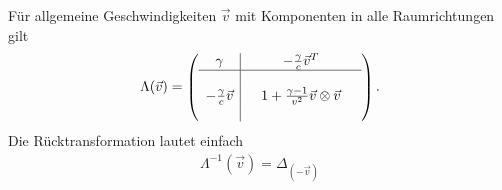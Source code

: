 Für allgemeine Geschwindigkeiten $\vec v$ mit Komponenten in alle Raumrichtungen gilt
\begin{align*}
    \Lambda(\vec v)=
    \left(\begin{array}{c|ccc}
              \gamma                   &  & -\frac{\gamma}{c}\vec{v}^T                    & \\
              \hline
                                       &  &                                               & \\
              -\frac{\gamma}{c}\vec{v} &  & 1 + \frac{\gamma-1}{v^2}\vec{v}\otimes\vec{v} & \\
                                       &  &                                               &
          \end{array}\right).
\end{align*}
Die Rücktransformation lautet einfach
\begin{align*}
    \Lambda^{-1}(\vec v) = \Delta_(-\vec v)
\end{align*}